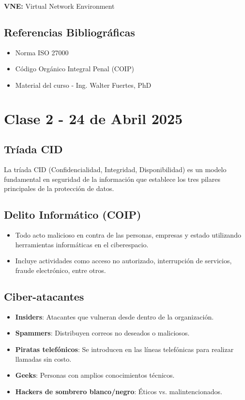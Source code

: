 \documentclass[12pt,a4paper]{article}
\begin{document}
\textbf{VNE:} Virtual Network Environment

\subsection{Referencias Bibliográficas}
\begin{itemize}
    \item Norma ISO 27000
    \item Código Orgánico Integral Penal (COIP)
    \item Material del curso - Ing. Walter Fuertes, PhD
\end{itemize}

\section{Clase 2 - 24 de Abril 2025}
\subsection{Tríada CID}
La tríada CID (Confidencialidad, Integridad, Disponibilidad) es un modelo fundamental en seguridad de la información que establece los tres pilares principales de la protección de datos.

\subsection{Delito Informático (COIP)}
\begin{itemize}
    \item Todo acto malicioso en contra de las personas, empresas y estado utilizando herramientas informáticas en el ciberespacio.
    \item Incluye actividades como acceso no autorizado, interrupción de servicios, fraude electrónico, entre otros.
\end{itemize}

\subsection{Ciber-atacantes}
\begin{itemize}
    \item \textbf{Insiders}: Atacantes que vulneran desde dentro de la organización.
    \item \textbf{Spammers}: Distribuyen correos no deseados o maliciosos.
    \item \textbf{Piratas telefónicos}: Se introducen en las líneas telefónicas para realizar llamadas sin costo.
    \item \textbf{Geeks}: Personas con amplios conocimientos técnicos.
    \item \textbf{Hackers de sombrero blanco/negro}: Éticos vs. malintencionados.
\end{itemize}
\end{document}
